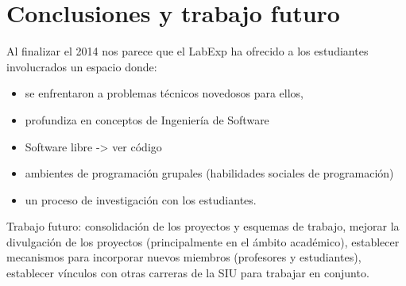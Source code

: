 \documentclass[conference]{IEEEtran}
\begin{document}




\section{Conclusiones y trabajo futuro}

Al finalizar el 2014 nos parece que el LabExp ha ofrecido a los estudiantes involucrados un espacio donde:

\begin{itemize}

\item se enfrentaron a problemas técnicos novedosos para ellos, 

\item profundiza en conceptos de Ingeniería de Software

\item Software libre -> ver código

\item ambientes de programación grupales (habilidades sociales de programación)

\item un proceso de investigación con los estudiantes.

\end{itemize}

Trabajo futuro: consolidación de los proyectos y esquemas de trabajo, mejorar la divulgación de los proyectos (principalmente en el ámbito académico), establecer mecanismos para incorporar nuevos miembros (profesores y estudiantes), establecer vínculos con otras carreras de la SIU para trabajar en conjunto. 





%






\end{document}
